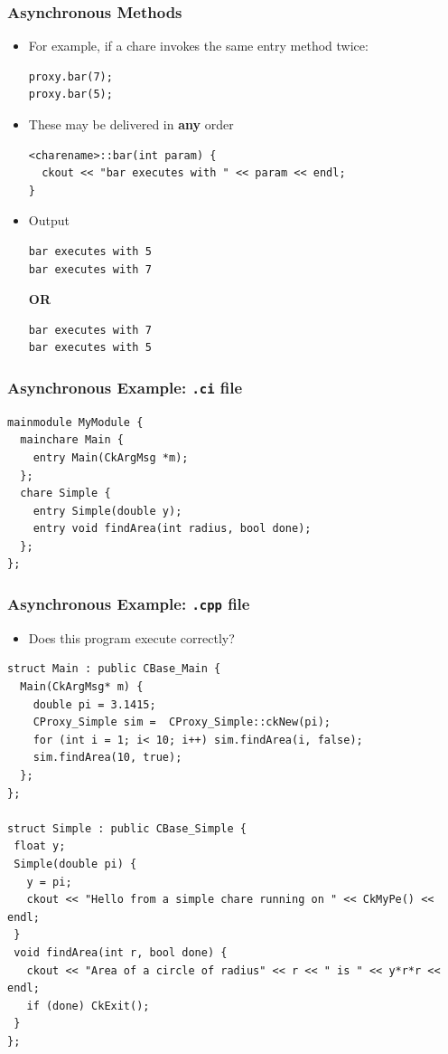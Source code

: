 \begin{frame}[fragile]
  \frametitle{Asynchronous Methods}
  \begin{itemize}
  \item For example, if a chare invokes the same entry method twice:
  \begin{lstlisting}
proxy.bar(7);
proxy.bar(5);
  \end{lstlisting}%
  \item These may be delivered in \textbf{any} order
  \begin{lstlisting}
<charename>::bar(int param) {
  ckout << "bar executes with " << param << endl;
}
\end{lstlisting}
  \item Output
\begin{lstlisting}
bar executes with 5
bar executes with 7
\end{lstlisting}
\textbf{OR}
\begin{lstlisting}
bar executes with 7
bar executes with 5
\end{lstlisting}
  \end{itemize}
\end{frame}


\begin{frame}[fragile]
  \frametitle{Asynchronous Example: \texttt{.ci} file}
\begin{lstlisting}
mainmodule MyModule {
  mainchare Main {
    entry Main(CkArgMsg *m);
  };
  chare Simple {
    entry Simple(double y);
    entry void findArea(int radius, bool done);
  };
};
\end{lstlisting}
\end{frame}

\begin{frame}[fragile]
  \frametitle{Asynchronous Example: \texttt{.cpp} file}
\begin{itemize}
  \item Does this program execute correctly?
\end{itemize}
\scriptsize
\begin{lstlisting}[basicstyle=\tiny]
struct Main : public CBase_Main {
  Main(CkArgMsg* m) {
    double pi = 3.1415;
    CProxy_Simple sim =  CProxy_Simple::ckNew(pi);
    for (int i = 1; i< 10; i++) sim.findArea(i, false);
    sim.findArea(10, true);
  };
};

struct Simple : public CBase_Simple {
 float y;
 Simple(double pi) {
   y = pi;
   ckout << "Hello from a simple chare running on " << CkMyPe() << endl;
 }
 void findArea(int r, bool done) {
   ckout << "Area of a circle of radius" << r << " is " << y*r*r << endl;
   if (done) CkExit();
 }
};
\end{lstlisting}
\end{frame}

